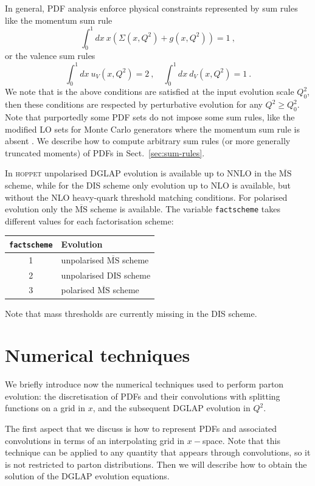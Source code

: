 \documentclass[12pt]{article}
\newcommand{\be}{\begin{equation}}
\newcommand{\ee}{\end{equation}}
\newcommand{\lp}{\left(}
\newcommand{\rp}{\right)}
\newcommand{\MSbar}{\overline{\mathrm{MS}}}
\newcommand{\hoppet}{\textsc{hoppet}\xspace}
\newcommand{\ttt}[1]{\texttt{#1}}
\begin{document}
In general, PDF analysis enforce physical constraints
represented by sum rules like the momentum sum rule
\be
\int_0^1 dx~x \lp \Sigma(x,Q^2)+g(x,Q^2)\rp =1 \ ,
\ee
or the valence sum rules
\be
\int_0^1 dx~ u_V(x,Q^2) =2 \ , \quad \int_0^1 dx~ d_V(x,Q^2) =1 \ .
\ee
We note that is the above conditions are satisfied at the input
evolution scale $Q_0^2$, then these conditions are respected
by perturbative evolution for any $Q^2 \ge Q_0^2$. Note that
purportedly some PDF sets do not impose some sum rules, like
the modified LO sets for Monte Carlo generators where the
momentum sum rule is absent \cite{Sherstnev:2008dm}. We describe how to compute
arbitrary sum rules (or more generally truncated moments)
of PDFs in Sect.~\ref{sec:sum-rules}.

In \hoppet unpolarised DGLAP evolution is available up to NNLO
in the $\MSbar$ scheme, while for the DIS scheme
only evolution up to NLO is available, but without the NLO heavy-quark
threshold matching conditions. For polarised evolution only
the $\MSbar$ scheme is available. The variable \ttt{factscheme}
takes different values for each factorisation scheme:
\begin{center}
  \begin{tabular}{|c|l|}\hline
    \ttt{factscheme} & Evolution\\[2pt]\hline
    1 & unpolarised $\MSbar$ scheme\\[2pt]\hline
    2 & unpolarised DIS scheme\\[2pt]\hline
    3 & polarised $\MSbar$ scheme\\\hline
  \end{tabular}
\end{center}
Note that mass thresholds are currently
missing in the DIS scheme.

\section{Numerical techniques}
\label{tricks}
We briefly introduce now the numerical techniques used to perform
parton evolution: the discretisation of PDFs and
their convolutions with splitting functions on a grid in $x$,
and the subsequent DGLAP evolution in $Q^2$. 

The first aspect that we discuss is how to represent PDFs
and associated convolutions in terms of an interpolating grid
in $x-$space.
Note that this technique can be applied to any quantity
that appears through convolutions, so it is not restricted
to parton distributions. Then we will describe how
to obtain the solution of the DGLAP evolution equations.
\end{document}
